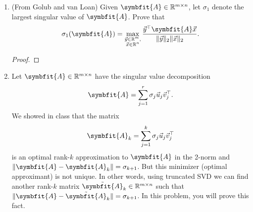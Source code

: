 \documentclass{article}
\theoremstyle{definition}
\newtheorem*{answer}{Answer}
\newcommand{\reals} {\mathbb{R}}
\newcommand{\mat}[1]{\symbfit{#1}}
\begin{document}
\begin{enumerate}[leftmargin=\labelsep]
\begin{enumerate}
\begin{answer}
\begin{align*}
\begin{bmatrix}
					                                                                    0.6  & -0.8 \\
					                                                                    -0.8 & -0.6 \\
				                                                                    \end{bmatrix}^\top,                       \\
				            \|\mat{A} - \mat{A}_1\|_2 & = 3.
			            \end{align*}
		            \end{answer}
	      \end{enumerate}

	\item (From Golub and van Loan) Given \(\mat{A} \in \reals^{m \times n}\), let \(\sigma_1\) denote the largest singular value of \(\mat{A}\). Prove that
	      \[
		      \sigma_1(\mat{A}) = \max_{\substack{\vec{y} \in \reals^m, \\ \vec{x} \in \reals^n}} \frac{\vec{y}^\top \mat{A} \vec{x}}{\|\vec{y}\|_2\|\vec{x}\|_2}.
	      \]
	      \begin{proof}

	      \end{proof}

	\item Let \(\mat{A} \in \reals^{m \times n}\) have the singular value decomposition
	      \[
		      \mat{A} = \sum_{j = 1}^r \sigma_j \vec{u}_j\vec{v}_j^\top.
	      \]
	      We showed in class that the matrix
	      \[
		      \mat{A}_k = \sum_{j = 1}^k \sigma_j \vec{u}_j\vec{v}_j^\top
	      \]
	      is an optimal rank-\(k\) approximation to \(\mat{A}\) in the 2-norm and \(\|\mat{A} - \mat{A}_k\| = \sigma_{k+1}\). But this minimizer (optimal approximant) is not unique. In other words, using truncated SVD we can find another rank-\(k\) matrix \(\tilde{\mat{A}}_k \in \reals^{m\times n}\) such that \(\|\mat{A} - \tilde{\mat{A}}_k\| = \sigma_{k+1}\). In this problem, you will prove this fact.


\end{enumerate}
\end{document}

